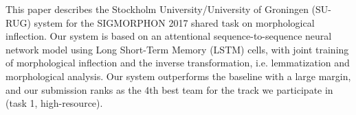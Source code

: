 This paper describes the Stockholm University/University of Groningen (SU-RUG) system for the SIGMORPHON 2017 shared task on morphological inflection. Our system is based on an attentional sequence-to-sequence neural network model using Long Short-Term Memory (LSTM) cells, with joint training of morphological inflection and the inverse transformation, i.e. lemmatization and morphological analysis. Our system outperforms the baseline with a large margin, and our submission ranks as the 4th best team for the track we participate in (task 1, high-resource).
